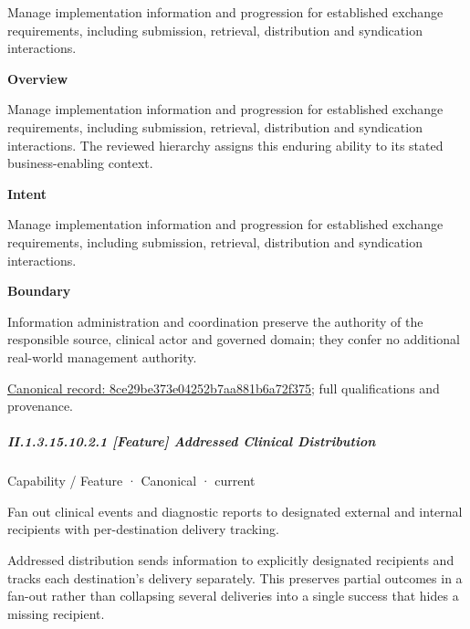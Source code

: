 Manage implementation information and progression for established exchange requirements, including submission, retrieval, distribution and syndication interactions.



\textbf{Overview}



Manage implementation information and progression for established exchange requirements, including submission, retrieval, distribution and syndication interactions. The reviewed hierarchy assigns this enduring ability to its stated business-enabling context.



\textbf{Intent}



Manage implementation information and progression for established exchange requirements, including submission, retrieval, distribution and syndication interactions.



\textbf{Boundary}



Information administration and coordination preserve the authority of the responsible source, clinical actor and governed domain; they confer no additional real-world management authority.


{\footnotesize \href{../../../../continuum/strategy/capability/8ce29be373e04252b7aa881b6a72f375.md}{Canonical record: 8ce29be373e04252b7aa881b6a72f375}; full qualifications and provenance.}\par
\subparagraph*{II.1.3.15.10.2.1 [Feature] Addressed Clinical Distribution}
\label{navigation:II.1.3.15.10.2.1}

\label{element:b476c86edab644c394da33d3de7bd0bd}
{\small Capability / Feature · Canonical · current}\par

Fan out clinical events and diagnostic reports to designated external and internal recipients with per-destination delivery tracking.



Addressed distribution sends information to explicitly designated recipients and tracks each destination's delivery separately. This preserves partial outcomes in a fan-out rather than collapsing several deliveries into a single success that hides a missing recipient.


